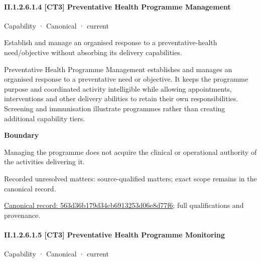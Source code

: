 \paragraph*{II.1.2.6.1.4 [CT3] Preventative Health Programme Management}
\label{navigation:II.1.2.6.1.4}

\label{element:563d36b179d34cb6913253d06e8d77f6}
{\small Capability · Canonical · current}\par

Establish and manage an organised response to a preventative-health need/objective without absorbing its delivery capabilities.



Preventative Health Programme Management establishes and manages an organised response to a preventative need or objective. It keeps the programme purpose and coordinated activity intelligible while allowing appointments, interventions and other delivery abilities to retain their own responsibilities. Screening and immunisation illustrate programmes rather than creating additional capability tiers.



\textbf{Boundary}



Managing the programme does not acquire the clinical or operational authority of the activities delivering it.


{\small Recorded unresolved matters: source-qualified matters; exact scope remains in the canonical record.}\par
{\footnotesize \href{../../../../continuum/strategy/capability/563d36b179d34cb6913253d06e8d77f6.md}{Canonical record: 563d36b179d34cb6913253d06e8d77f6}; full qualifications and provenance.}\par
\paragraph*{II.1.2.6.1.5 [CT3] Preventative Health Programme Monitoring}
\label{navigation:II.1.2.6.1.5}

\label{element:945b40ced8004e1cbf7c98c731d17daf}
{\small Capability · Canonical · current}\par

